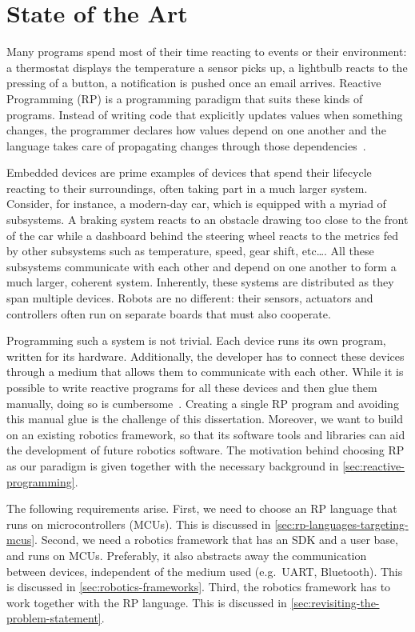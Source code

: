 \documentclass[a4paper]{book}
\begin{document}
\chapter{State of the Art}
\label{ch:state-of-the-art}
Many programs spend most of their time reacting to events or their environment:
a thermostat displays the temperature a sensor picks up, a lightbulb reacts to
the pressing of a button, a notification is pushed once an email arrives.
Reactive Programming (RP) is a programming paradigm that suits these kinds of
programs. Instead of writing code that explicitly updates values when something
changes, the programmer declares how values depend on one another and the
language takes care of propagating changes through those
dependencies~\cite{surveyRP2024}.
\par
Embedded devices are prime examples of devices that spend their lifecycle
reacting to their surroundings, often taking part in a much larger system.
Consider, for instance, a modern-day car, which is equipped with a myriad of
subsystems. A braking system reacts to an obstacle drawing too close to the
front of the car while a dashboard behind the steering wheel reacts to the
metrics fed by other subsystems such as temperature, speed, gear shift,
etc\dots. All these subsystems communicate with each other and depend on one
another to form a much larger, coherent system. Inherently, these systems are
distributed as they span multiple devices. Robots are no different: their
sensors, actuators and controllers often run on separate boards that must also
cooperate.
\par
Programming such a system is not trivial. Each device runs its own program,
written for its hardware. Additionally, the developer has to connect these
devices through a medium that allows them to communicate with each other. While
it is possible to write reactive programs for all these devices and then glue
them manually, doing so is cumbersome~\cite{surveyRP2024,
weisenburger2018scalaloci}. Creating a single RP program and avoiding this
manual glue is the challenge of this dissertation. Moreover, we want to build on
an existing robotics framework, so that its software tools and libraries can aid
the development of future robotics software. The motivation behind choosing RP
as our paradigm is given together with the necessary background in
\cref{sec:reactive-programming}.
\par
The following requirements arise. First, we need to choose an RP language that
runs on microcontrollers (MCUs). This is discussed in
\cref{sec:rp-languages-targeting-mcus}. Second, we need a robotics framework
that has an SDK and a user base, and runs on MCUs. Preferably, it also abstracts
away the communication between devices, independent of the medium used (e.g.\
UART, Bluetooth). This is discussed in \cref{sec:robotics-frameworks}. Third,
the robotics framework has to work together with the RP language. This is
discussed in \cref{sec:revisiting-the-problem-statement}.
\end{document}
